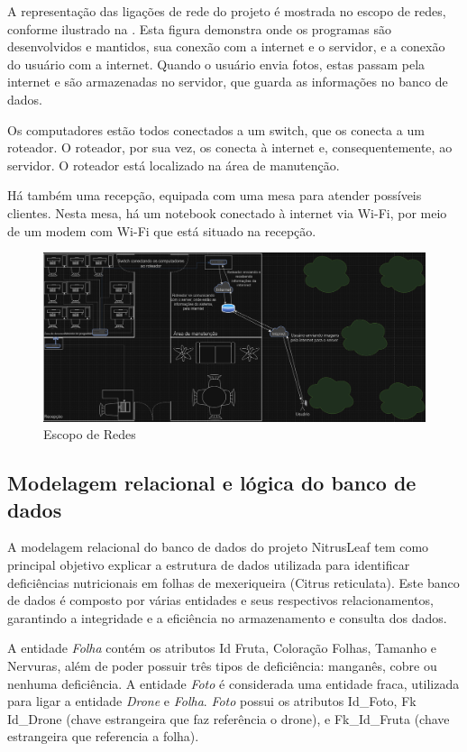 \documentclass[
    a4paper,%
    12pt,%
    english,%
    brazilian,%
]{article}
\begin{document}
A representação das ligações de rede do projeto é mostrada no escopo de redes, conforme ilustrado na . Esta figura demonstra onde os programas são desenvolvidos e mantidos, sua conexão com a internet e o servidor, e a conexão do usuário com a internet. Quando o usuário envia fotos, estas passam pela internet e são armazenadas no servidor, que guarda as informações no banco de dados.

Os computadores estão todos conectados a um switch, que os conecta a um roteador. O roteador, por sua vez, os conecta à internet e, consequentemente, ao servidor. O roteador está localizado na área de manutenção.

Há também uma recepção, equipada com uma mesa para atender possíveis clientes. Nesta mesa, há um notebook conectado à internet via Wi-Fi, por meio de um modem com Wi-Fi que está situado na recepção.

\begin{figure}[H]
\centering
\caption{Escopo de Redes}%
\label{fig:escopoderedes}
\includegraphics[width=0.8\linewidth]{Logos/escopoderedes.png}
\end{figure}

\subsection*{\textbf{Modelagem relacional e lógica do banco de dados}}


A modelagem relacional do banco de dados  do projeto NitrusLeaf tem como principal objetivo explicar a estrutura de dados utilizada para identificar deficiências nutricionais em folhas de mexeriqueira (Citrus reticulata). Este banco de dados é composto por várias entidades e seus respectivos relacionamentos, garantindo a integridade e a eficiência no armazenamento e consulta dos dados.

A entidade \textit{Folha} contém os atributos Id Fruta, Coloração Folhas, Tamanho e Nervuras, além de poder possuir três tipos de deficiência: manganês, cobre ou nenhuma deficiência. A entidade \textit{Foto} é considerada uma entidade fraca, utilizada para ligar a entidade \textit{Drone} e \textit{Folha}. \textit{Foto} possui os atributos Id\_Foto, Fk Id\_Drone (chave estrangeira que faz referência o drone), e Fk\_Id\_Fruta (chave estrangeira que referencia a folha).
\end{document}
